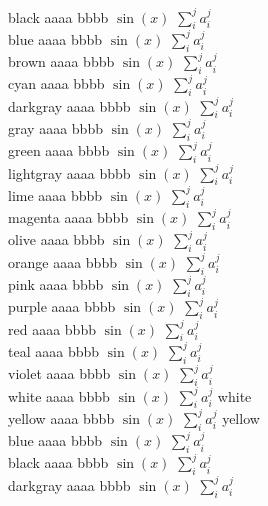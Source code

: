 \documentclass[amsfonts,aps, prl,nofootinbib, twocolumn,showpacs, showkeys,longbibliography]{revtex4-1}
\begin{document}
\noindent
{\color{black} black aaaa bbbb $\sin(x)$ $\sum_{i}^{j} a_{i}^{j}$}\\
{\color{blue} blue aaaa bbbb $\sin(x)$ $\sum_{i}^{j} a_{i}^{j}$}\\
{\color{brown} brown aaaa bbbb $\sin(x)$ $\sum_{i}^{j} a_{i}^{j}$}\\
{\color{cyan} cyan aaaa bbbb $\sin(x)$ $\sum_{i}^{j} a_{i}^{j}$}\\
{\color{darkgray} darkgray aaaa bbbb $\sin(x)$ $\sum_{i}^{j} a_{i}^{j}$}\\
{\color{gray} gray aaaa bbbb $\sin(x)$ $\sum_{i}^{j} a_{i}^{j}$}\\
{\color{green} green aaaa bbbb $\sin(x)$ $\sum_{i}^{j} a_{i}^{j}$}\\
{\color{lightgray} lightgray aaaa bbbb $\sin(x)$ $\sum_{i}^{j} a_{i}^{j}$}\\
{\color{lime} lime aaaa bbbb $\sin(x)$ $\sum_{i}^{j} a_{i}^{j}$}\\
{\color{magenta} magenta aaaa bbbb $\sin(x)$ $\sum_{i}^{j} a_{i}^{j}$}\\
{\color{olive} olive aaaa bbbb $\sin(x)$ $\sum_{i}^{j} a_{i}^{j}$}\\
{\color{orange} orange aaaa bbbb $\sin(x)$ $\sum_{i}^{j} a_{i}^{j}$}\\
{\color{pink} pink aaaa bbbb $\sin(x)$ $\sum_{i}^{j} a_{i}^{j}$}\\
{\color{purple} purple aaaa bbbb $\sin(x)$ $\sum_{i}^{j} a_{i}^{j}$}\\
{\color{red} red aaaa bbbb $\sin(x)$ $\sum_{i}^{j} a_{i}^{j}$}\\
{\color{teal} teal aaaa bbbb $\sin(x)$ $\sum_{i}^{j} a_{i}^{j}$}\\
{\color{violet} violet aaaa bbbb $\sin(x)$ $\sum_{i}^{j} a_{i}^{j}$}\\
{\color{white} white aaaa bbbb $\sin(x)$ $\sum_{i}^{j} a_{i}^{j}$} white\\
{\color{yellow} yellow aaaa bbbb $\sin(x)$ $\sum_{i}^{j} a_{i}^{j}$} yellow\\
{\color{blue} blue aaaa bbbb $\sin(x)$ $\sum_{i}^{j} a_{i}^{j}$}\\

\noindent
{\color{black} black aaaa bbbb $\sin(x)$ $\sum_{i}^{j} a_{i}^{j}$}\\
{\color{darkgray} darkgray aaaa bbbb $\sin(x)$ $\sum_{i}^{j} a_{i}^{j}$}\\
\end{document}
